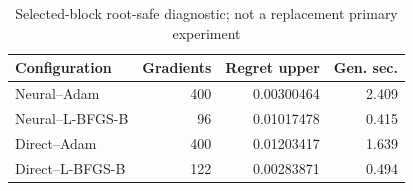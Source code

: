 \begin{table}[htbp]\caption{Selected-block root-safe diagnostic; not a replacement primary experiment}\begin{tabular}{lrrr}\toprule
Configuration & Gradients & Regret upper & Gen. sec.\\\midrule
Neural--Adam & 400 & 0.00300464 & 2.409\\
Neural--L-BFGS-B & 96 & 0.01017478 & 0.415\\
Direct--Adam & 400 & 0.01203417 & 1.639\\
Direct--L-BFGS-B & 122 & 0.00283871 & 0.494\\
\bottomrule\end{tabular}\end{table}
